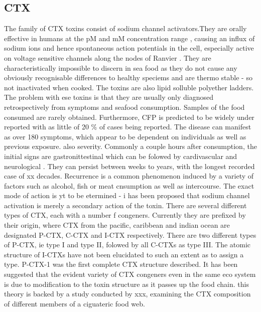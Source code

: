 \documentclass[12pt]{article}
\begin{document}
\subsection{CTX}
The family of CTX toxins consist of sodium channel activators.They are orally effective in humans at the pM and mM concentration range \cite{molgo2000ciguatera}, causing an influx of sodium ions and hence spontaneous action potentials in the cell, especially active on voltage sensitive channels along the nodes of Ranvier \cite{sims1987theoretical,mattei1999neurotoxins,lewis1992action,molgo2000ciguatera}. They are characteristically impossible to discern in sea food as they do not cause any obviously recognisable differences to healthy speciems and are thermo stable \cite{withers1982ciguatera} - so not inactivated when cooked. The toxins are also lipid solluble polyether ladders. The problem with ese toxins is that they are usually only diagnosed retrospectively from symptoms and seafood consumption. Samples of the food consumed are rarely obtained. Furthermore, CFP is predicted to be widely under reported with as little of 20 \% of cases being reported. The disease can manifest as over 180 symptoms, which appear to be dependent on individuals as well as previous exposure. also severity. Commonly a couple hours after consumption, the initial signs are gastronittestinal which can be folowed by cardivascular and neurological \cite{sims1987theoretical}. They can persist between weeks to years, with the longest recorded case of xx decades. Recurrence is a common phenomenon induced by a variety of factors such as alcohol, fish or meat cnsumption as well as intercourse. 
The exact mode of action is yt to be etermined - i has been proposed that sodium channel activation is merely a secondary action of the toxin.
There are several different types of CTX, each with a number f congeners. Currently they are prefixed by their origin, where CTX from the pacific, caribbean and indian ocean are designated P-CTX, C-CTX and I-CTX respectively. 
There are two different types of P-CTX, ie type I and type II, folowed by all C-CTXs as type III. The atomic structure of I-CTXs have not been elucidated to such an extent as to assign a type.  
P-CTX-1 was the first complete CTX structure described.
It has been suggested that the evident variety of CTX congeners even in the same eco system is due to modification to the toxin structure as it passes up the food chain. this theory is backed by a study conducted by xxx, examining the CTX composition of different members of a ciguateric food web.
\end{document}
